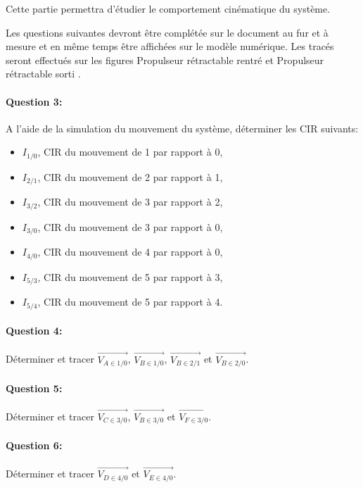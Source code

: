 Cette partie permettra d'étudier le comportement cinématique du système.

Les questions suivantes devront être complétée sur le document au fur et à mesure et en même temps être affichées sur le modèle numérique. Les tracés seront effectués sur les figures \og Propulseur rétractable rentré \fg et \og Propulseur rétractable sorti \fg.

\paragraph{Question 3:} A l'aide de la simulation du mouvement du système, déterminer les CIR suivants:
\begin{itemize}
 \item $I_{1/0}$, CIR du mouvement de 1 par rapport à 0,
 \item $I_{2/1}$, CIR du mouvement de 2 par rapport à 1,
 \item $I_{3/2}$, CIR du mouvement de 3 par rapport à 2,
 \item $I_{3/0}$, CIR du mouvement de 3 par rapport à 0,
 \item $I_{4/0}$, CIR du mouvement de 4 par rapport à 0,
 \item $I_{5/3}$, CIR du mouvement de 5 par rapport à 3,
 \item $I_{5/4}$, CIR du mouvement de 5 par rapport à 4.
\end{itemize}

\paragraph{Question 4:} Déterminer et tracer $\overrightarrow{V_{A\in 1/0}}$, $\overrightarrow{V_{B\in 1/0}}$, $\overrightarrow{V_{B\in 2/1}}$ et $\overrightarrow{V_{B\in 2/0}}$.

\reponse[1]

\paragraph{Question 5:} Déterminer et tracer $\overrightarrow{V_{C\in 3/0}}$, $\overrightarrow{V_{B\in 3/0}}$ et $\overrightarrow{V_{F\in 3/0}}$.

\reponse[1]

\paragraph{Question 6:} Déterminer et tracer $\overrightarrow{V_{D\in 4/0}}$ et $\overrightarrow{V_{E\in 4/0}}$.

